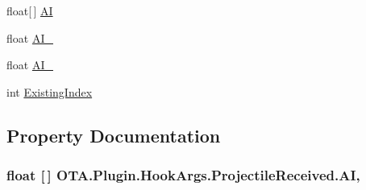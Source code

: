 \begin{DoxyCompactItemize}
\item 
float\mbox{[}$\,$\mbox{]} \hyperlink{struct_o_t_a_1_1_plugin_1_1_hook_args_1_1_projectile_received_a63c282c667ce4fbc54ec24944ee0a540}{A\+I}
\item 
float \hyperlink{struct_o_t_a_1_1_plugin_1_1_hook_args_1_1_projectile_received_a4ad18034a1100ae9f04500fd3bdd85f2}{A\+I\+\_}
\item 
float \hyperlink{struct_o_t_a_1_1_plugin_1_1_hook_args_1_1_projectile_received_a78baa30408b35711b5c7d994dbf7eaae}{A\+I\+\_}
\item 
int \hyperlink{struct_o_t_a_1_1_plugin_1_1_hook_args_1_1_projectile_received_abb7757817e38117717086833e420026b}{Existing\+Index}
\end{DoxyCompactItemize}


\subsection{Property Documentation}
\hypertarget{struct_o_t_a_1_1_plugin_1_1_hook_args_1_1_projectile_received_a63c282c667ce4fbc54ec24944ee0a540}{}
\subsubsection[{A\+I}]{\setlength{\rightskip}{0pt plus 5cm}float \mbox{[}$\,$\mbox{]} O\+T\+A.\+Plugin.\+Hook\+Args.\+Projectile\+Received.\+A\+I\hspace{0.3cm}{\ttfamily [get]}, {\ttfamily [set]}}\label{struct_o_t_a_1_1_plugin_1_1_hook_args_1_1_projectile_received_a63c282c667ce4fbc54ec24944ee0a540}
\hypertarget{struct_o_t_a_1_1_plugin_1_1_hook_args_1_1_projectile_received_a4ad18034a1100ae9f04500fd3bdd85f2}{}
